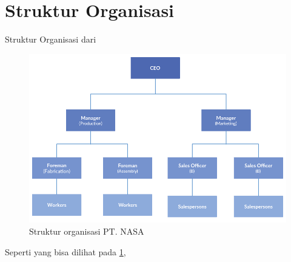 \section{Struktur Organisasi}
\vspace{1ex}

Struktur Organisasi dari \lipsum[1]
\vspace{0.5ex}

\begin{figure} [!ht] \centering
	\includegraphics[scale=0.45]{gambar/struktur-organisasi.png}
	\caption{Struktur organisasi PT. NASA}
	\label{fig:struktur_organisasi}
\end{figure}

Seperti yang bisa dilihat pada \ref{fig:struktur_organisasi}, \lipsum[1]
\vspace{0.5ex}
